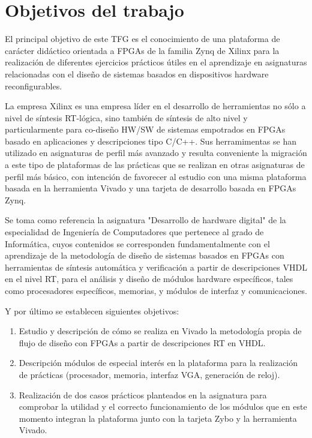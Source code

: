 \chapter{Objetivos del trabajo}

El principal objetivo de este TFG es el conocimiento de una plataforma de carácter didáctico orientada a FPGAs de la familia Zynq de Xilinx para la 
realización de diferentes ejercicios prácticos útiles en el aprendizaje en asignaturas relacionadas con el diseño de sistemas 
basados en dispositivos hardware reconfigurables.

La empresa Xilinx es una empresa líder en el desarrollo de herramientas no sólo a nivel de síntesis RT-lógica, sino 
también de síntesis de alto nivel y particularmente para co-diseño HW/SW de sistemas empotrados en FPGAs basado en aplicaciones y 
descripciones tipo C/C++. Sus herramimentas se han utilizado en asignaturas de perfil más avanzado y resulta conveniente la 
migración a este tipo de plataformas de las prácticas que se realizan en otras asignaturas de perfil más básico, con intención de 
favorecer al estudio con una misma plataforma basada en la herramienta Vivado y una tarjeta de desarrollo basada en
FPGAs Zynq.
 
Se toma como referencia la asignatura "Desarrollo de hardware digital" de la especialidad de Ingeniería de Computadores que pertenece al 
grado de Informática, cuyos contenidos se corresponden fundamentalmente con el aprendizaje de la metodología de diseño de sistemas basados en FPGAs con herramientas de síntesis 
automática y verificación a partir de descripciones VHDL en el nivel RT, para el análisis y diseño de módulos hardware específicos, tales 
como procesadores específicos, memorias, y módulos de interfaz y comunicaciones.

Y por último se establecen siguientes objetivos:
\begin{enumerate}
    \item Estudio y descripción de cómo se realiza en Vivado la metodología propia de flujo de diseño con FPGAs a partir de descripciones RT en VHDL.
    \item Descripción módulos de especial interés en la plataforma para la realización de prácticas (procesador, memoria, interfaz VGA, generación de reloj).
    \item Realización de dos casos prácticos planteados en la asignatura para comprobar la utilidad y el correcto funcionamiento de los módulos que en este 
    momento integran la plataforma junto con la tarjeta Zybo y la herramienta Vivado.
\end{enumerate}